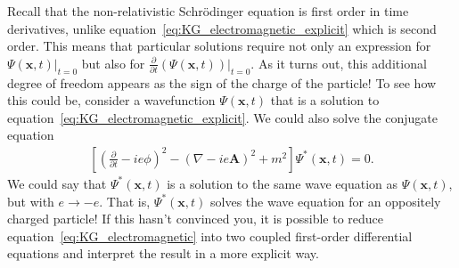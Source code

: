 \documentclass[titlepage,letterpaper,onecolumn,11pt,final]{report}
\newcommand{\psxt}{\Psi (\mathbf{x},t)}
\numberwithin{equation}{section}
\numberwithin{figure}{section}
\begin{document}
Recall that the non-relativistic Schr\"{o}dinger equation is first order in time derivatives, unlike equation~\ref{eq:KG_electromagnetic_explicit} which is second order. This means that particular solutions require not only an expression for $\psxt \big|_{t=0}$ but also for $\frac{\partial}{\partial t} \left( \psxt \right) \big|_{t=0}$. As it turns out, this additional degree of freedom appears as the sign of the charge of the particle! To see how this could be, consider a wavefunction $\psxt$ that is a solution to equation~\ref{eq:KG_electromagnetic_explicit}. We could also solve the conjugate equation
\begin{gather}
	\label{eq:KG_electromagnetic_explicit_cc}
	\left[ \left( \frac{\partial}{\partial t} - i e \phi \right)^{2} - \left( \nabla - i e \mathbf{A} \right)^{2} + m^{2} \right] \Psi^{*} (\mathbf{x},t) = 0 .
\end{gather}
%
We could say that $\Psi^{*} (\mathbf{x},t)$ is a solution to the same wave equation as $\Psi (\mathbf{x},t)$, but with $e \rightarrow -e$. That is, $\Psi^{*} (\mathbf{x},t)$ solves the wave equation for an oppositely charged particle! If this hasn't convinced you, it is possible to reduce equation~\ref{eq:KG_electromagnetic} into two coupled first-order differential equations and interpret the result in a more explicit way.
\end{document}
